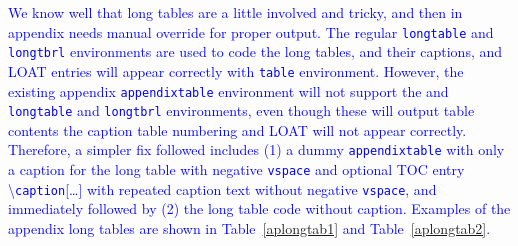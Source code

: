 \documentclass[phd,showgrids]{ndsu-thesis-2022}
\newcommand\italk[1]{\textcolor{blue}{#1}}  %
\newcommand\cmd[1]{\textbackslash\texttt{#1}}  %
\newcommand\vb[1]{\textcolor{blue}{\texttt{#1}}}%
\begin{document}
\italk{We know well that long tables are a little involved and tricky, and then in appendix needs manual override for proper output. The regular \vb{longtable} and \vb{longtbrl} environments are used to code the long tables, and their captions, and LOAT entries will appear correctly with \vb{table} environment. However, the existing appendix \vb{appendixtable} environment will not support the and \vb{longtable} and \vb{longtbrl} environments, even though these will output table contents the caption table numbering and LOAT will not appear correctly. Therefore, a simpler fix followed includes (1) a dummy \vb{appendixtable} with only a caption for the long table with negative \vb{vspace} and optional TOC entry \cmd{caption}[\ldots] with repeated caption text without negative \vb{vspace}, and immediately followed by (2) the long table code without caption. Examples of the appendix long tables are shown in Table~\ref{aplongtab1} and Table~\ref{aplongtab2}.}  
\end{document}
